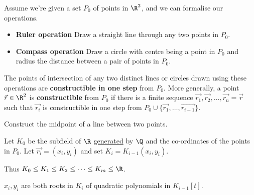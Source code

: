 \documentclass{article}
\begin{document}
Assume we're given a set $P_0$ of points in $\R^2$, and we can formalise our operations.
\begin{itemize}[label={}, leftmargin=*]
    \item \textbf{Ruler operation} Draw a straight line through any two points in $P_0$.
    \item \textbf{Compass operation} Draw a circle with centre being a point in $P_0$ and radius the distance between a pair of points in $P_0$.
\end{itemize}

\begin{ndef}
    The points of intersection of any two distinct lines or circles drawn using these operations are \textbf{constructible in one step} from $P_0$.
    More generally, a point $\vec{r} \in \R^2$ is \textbf{constructible} from $P_0$ if there is a finite sequence $\vec{r_1}, \vec{r_2}, \dotsc, \vec{r_n} = \vec{r}$ such that $\vec{r_i}$ is constructible in one step from $P_0 \cup \{\vec{r_1}, \dotsc, \vec{r_{i-1}}\}$.
\end{ndef}

\begin{exercise}
    Construct the midpoint of a line between two points.
\end{exercise}

Let $K_0$ be the subfield of $\R$ \hyperlink{def:genField}{generated} by $\Q$ and the co-ordinates of the points in $P_0$. Let $\vec{r_i} = (x_i, y_i)$ and set $K_i = K_{i-1} (x_i, y_i)$.

Thus $K_0 \leq K_1 \leq K_2 \leq \dots \leq K_m \leq \R$.

\begin{nlemma}\label{lem:1.13}
    $x_i, y_i$ are both roots in $K_i$ of quadratic polynomials in $K_{i-1}[t]$.
\end{nlemma}
\end{document}
